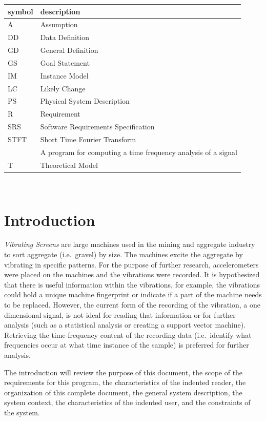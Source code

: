 \documentclass[12pt]{article}
\begin{document}
\renewcommand{\arraystretch}{1.2}
\begin{tabular}{l l} 
  \toprule		
  \textbf{symbol} & \textbf{description}\\
  \midrule 
  A & Assumption\\
  DD & Data Definition\\
  GD & General Definition\\
  GS & Goal Statement\\
  IM & Instance Model\\
  LC & Likely Change\\
  PS & Physical System Description\\
  R & Requirement\\
  SRS & Software Requirements Specification\\
  STFT & Short Time Fourier Transform\\
  \progname{} & A program for computing a time frequency analysis of a signal\\
  T & Theoretical Model\\
  \bottomrule
\end{tabular}\\


\newpage


\section{Introduction}

\emph{Vibrating Screens} are large machines used in the mining and aggregate industry to sort aggregate (i.e.\ gravel) by size. The machines excite the aggregate by vibrating in specific patterns. For the purpose of further research, accelerometers were placed on the machines and the vibrations were recorded. It is hypothesized that there is useful information within the vibrations, for example, the vibrations could hold a unique machine fingerprint or indicate if a part of the machine needs to be replaced. However, the current form of the recording of the vibration, a one dimensional signal, is not ideal for reading that information or for further analysis (such as a statistical analysis or creating a support vector machine). Retrieving the 
time-frequency content of the recording data (i.e.\ identify what frequencies 
occur at what time instance of the sample) is preferred for further analysis.

The introduction will review the purpose of this document, the scope of the requirements for this program, the characteristics of the indented reader, the organization of this complete document, the general system description, the system context, the characteristics of the indented user, and the constraints of the system. 
\end{document}
